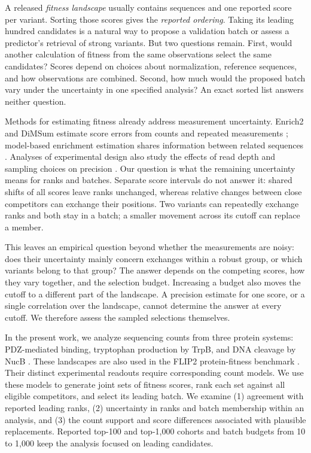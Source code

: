 \documentclass[11pt]{article}
\begin{document}
A released \emph{fitness landscape} usually contains sequences and one
reported score per variant. Sorting those scores gives the \emph{reported
ordering}. Taking its leading hundred candidates is a natural way to
propose a validation batch or assess a predictor's retrieval of strong
variants. But two questions remain. First, would another calculation of
fitness from the same observations select the same candidates? Scores
depend on choices about normalization, reference sequences, and how
observations are combined. Second, how much would the proposed batch vary
under the uncertainty in one specified analysis? An exact sorted list
answers neither question.

Methods for estimating fitness already address measurement uncertainty.
Enrich2 and DiMSum estimate score errors from counts and repeated
measurements \citep{rubin2017,faure2020}; model-based enrichment estimation
shares information between related sequences \citep{busia2023}. Analyses
of experimental design also study the effects of read depth and sampling
choices on precision \citep{matuszewski2016}. Our question is what the
remaining uncertainty means for ranks and batches. Separate score intervals
do not answer it: shared shifts of all scores leave ranks unchanged,
whereas relative changes between close competitors can exchange their
positions. Two variants can repeatedly exchange ranks and both stay in
a batch; a smaller movement across its cutoff can replace a member.

This leaves an empirical question beyond whether the measurements are
noisy: does their uncertainty mainly concern exchanges within a robust
group, or which variants belong to that group? The answer depends on
the competing scores, how they vary together, and the selection budget.
Increasing a budget also moves the cutoff to a different part of the
landscape. A precision estimate for one score, or a single correlation
over the landscape, cannot determine the answer at every cutoff.
We therefore assess the sampled selections themselves.

In the present work, we analyze sequencing counts from three protein
systems: PDZ-mediated binding, tryptophan production by TrpB, and DNA
cleavage by NucB \citep{zarin2024,johnston2024,thomas2025}. These landscapes
are also used in the FLIP2 protein-fitness benchmark \citep{didi2026}.
Their distinct experimental readouts require corresponding count models.
We use these models to generate joint sets of fitness scores, rank each set against
all eligible competitors, and select its leading batch. We examine
(1) agreement with reported leading ranks, (2) uncertainty in ranks and
batch membership within an analysis, and (3) the count support and score
differences associated with plausible replacements. Reported top-100 and
top-1,000 cohorts and batch budgets from 10 to 1,000 keep the analysis
focused on leading candidates.
\end{document}
